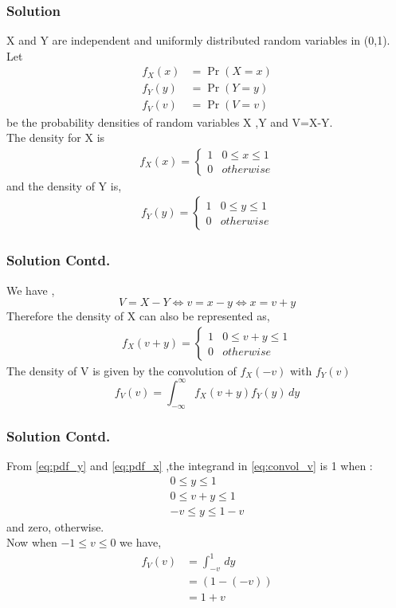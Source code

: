 \documentclass{beamer}
\providecommand{\pr}[1]{\ensuremath{\Pr\left(#1\right)}}
\begin{document}
\begin{frame}
\frametitle{Solution}
X and Y are independent and uniformly distributed random variables in (0,1). Let
\begin{align}
    f_X(x) &= \pr{X=x} \\
    f_Y(y) &= \pr{Y=y}  \\
    f_V(v) &= \pr{V=v}
\end{align}
be the probability densities of random variables X ,Y and V=X-Y.\\
The density for X is \\
\begin{align}
\label{eq:_pdf_x}
f_{X}(x)  = 
\begin{cases}
1 & 0 \le x \le 1
\\
0 & otherwise
\end{cases}
\end{align}
and the density of Y is,
\begin{align}
\label{eq:pdf_y}
f_{Y}(y)  = 
\begin{cases}
1 & 0 \le y \le 1
\\
0 & otherwise
\end{cases}
\end{align}
\end{frame}

\begin{frame}
\frametitle{Solution Contd.}
We have ,
\begin{equation}
    V= X-Y \iff v= x- y \iff x = v+y
\end{equation}
Therefore the density of X can also be represented as,
\begin{align}
\label{eq:pdf_x}
f_{X}(v+y)  = 
\begin{cases}
1 & 0 \le v+y \le 1
\\
0 & otherwise
\end{cases}
\end{align}
The density of V is given by the convolution of $f_X(-v)$ with $f_Y(v)$
\begin{equation} \label{eq:convol_v}
    f_V(v) =  \int_{- \infty}^{\infty} f_X(v+y)f_Y(y) \,dy 
\end{equation}
\end{frame}

\begin{frame}
\frametitle{Solution Contd.}
From \eqref{eq:pdf_y} and \eqref{eq:pdf_x} ,the integrand in \eqref{eq:convol_v} is 1 when :
\begin{align}
    0 \le y \le 1 \\
    0 \le v+y \le 1 \\
    -v \le y \le 1-v
\end{align}
and zero, otherwise. \\
Now when $-1 \le v \le 0$ we have, 
\begin{align}
    f_V(v) &=   \int_{-v}^{1} \,dy  \\
          &= (1 - (-v)) \\
          &= 1+v
\end{align}
\end{frame}
\end{document}
